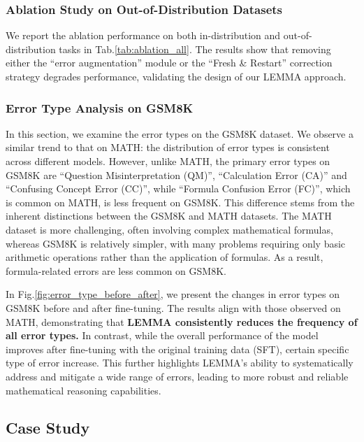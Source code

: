 \subsubsection{Ablation Study on Out-of-Distribution Datasets}

We report the ablation performance on both in-distribution and out-of-distribution tasks in Tab.\ref{tab:ablation_all}. The results show that removing either the ``error augmentation'' module or the ``Fresh \& Restart'' correction strategy degrades performance, validating the design of our LEMMA approach.  

\subsubsection{Error Type Analysis on GSM8K}



In this section, we examine the error types on the GSM8K dataset. We observe a similar trend to that on MATH: the distribution of error types is consistent across different models. However, unlike MATH, the primary error types on GSM8K are ``Question Misinterpretation (QM)'', ``Calculation Error (CA)'' and ``Confusing Concept Error (CC)'', while ``Formula Confusion Error (FC)'', which is common on MATH, is less frequent on GSM8K. This difference stems from the inherent distinctions between the GSM8K and MATH datasets. The MATH dataset is more challenging, often involving complex mathematical formulas, whereas GSM8K is relatively simpler, with many problems requiring only basic arithmetic operations rather than the application of formulas. As a result, formula-related errors are less common on GSM8K.

In Fig.\ref{fig:error_type_before_after}, we present the changes in error types on GSM8K before and after fine-tuning. The results align with those observed on MATH, demonstrating that \textbf{LEMMA consistently reduces the frequency of all error types.} In contrast, while the overall performance of the model improves after fine-tuning with the original training data (SFT), certain specific type of error increase. This further highlights LEMMA's ability to systematically address and mitigate a wide range of errors, leading to more robust and reliable mathematical reasoning capabilities.

\subsection{Case Study}
\label{sec:case_study}

